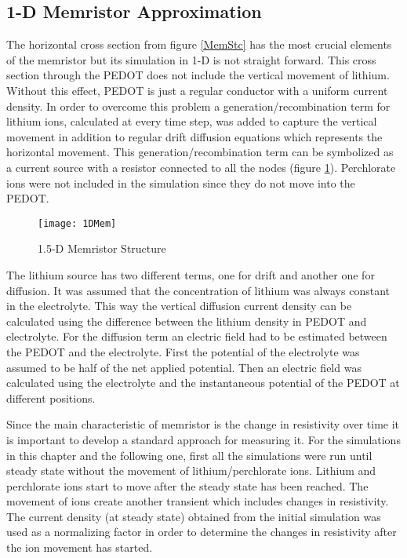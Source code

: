 {\clearpage
\subsection{1-D Memristor Approximation}

The horizontal cross section from figure \ref{MemStc} has the most crucial elements of the memristor but its simulation in 1-D is not straight forward. This cross section through the PEDOT does not include the vertical movement of lithium. Without this effect, PEDOT is just a regular conductor with a uniform current density. In order to overcome this problem a generation/recombination term for lithium ions, calculated at every time step, was added to capture the vertical movement in addition to regular drift diffusion equations which represents the horizontal movement. This generation/recombination term can be symbolized as a current source with a resistor connected to all the nodes (figure \ref{MemStc15}). Perchlorate ions were not included in the simulation since they do not move into the PEDOT.

\begin{figure}[!htp]
\centering
\texttt{[image: 1DMem]}
\caption{1.5-D Memristor Structure} 
\label{MemStc15}
\end{figure}

The lithium source has two different terms, one for drift and another one for diffusion. It was assumed that the concentration of lithium was always constant in the electrolyte. This way the vertical diffusion current density can be calculated using the difference between the lithium density in PEDOT and electrolyte. For the diffusion term an electric field had to be estimated between the PEDOT and the electrolyte. First the potential of the electrolyte was assumed to be half of the net applied potential. Then an electric field was calculated using the electrolyte and the instantaneous potential of the PEDOT at different positions.

Since the main characteristic of memristor is the change in resistivity over time it is important to develop a standard approach for measuring it. For the simulations in this chapter and the following one, first all the simulations were run until steady state without the movement of lithium/perchlorate ions. Lithium and perchlorate ions start to move after the steady state has been reached. The movement of ions create another transient which includes changes in resistivity. The current density (at steady state) obtained from the initial simulation was used as a normalizing factor in order to determine the changes in resistivity after the ion movement has started.

}
